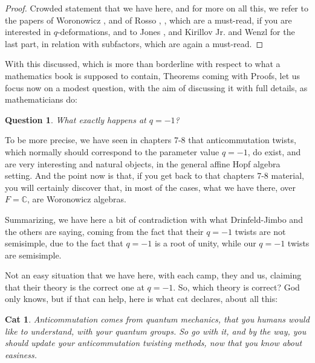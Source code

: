 \documentclass[12pt]{amsbook}
\newtheorem{cat}[theorem]{Cat}
\newtheorem{question}[theorem]{Question}
\begin{document}
\begin{proof}
Crowded statement that we have here, and for more on all this, we refer to the papers of Woronowicz \cite{wo1}, \cite{wo2} and of Rosso \cite{ro1}, \cite{ro2}, which are a must-read, if you are interested in $q$-deformations, and to Jones \cite{jo1}, \cite{jo3} and Kirillov Jr. \cite{kir} and Wenzl \cite{wen} for the last part, in relation with subfactors, which are again a must-read.
\end{proof}

With this discussed, which is more than borderline with respect to what a mathematics book is supposed to contain, Theorems coming with Proofs, let us focus now on a modest question, with the aim of discussing it with full details, as mathematicians do:

\begin{question}
What exactly happens at $q=-1$?
\end{question}

To be more precise, we have seen in chapters 7-8 that anticommutation twists, which normally should correspond to the parameter value $q=-1$, do exist, and are very interesting and natural objects, in the general affine Hopf algebra setting. And the point now is that, if you get back to that chapters 7-8 material, you will certainly discover that, in most of the cases, what we have there, over $F=\mathbb C$, are Woronowicz algebras.

\bigskip

Summarizing, we have here a bit of contradiction with what Drinfeld-Jimbo and the others are saying, coming from the fact that their $q=-1$ twists are not semisimple, due to the fact that $q=-1$ is a root of unity, while our $q=-1$ twists are semisimple.

\bigskip

Not an easy situation that we have here, with each camp, they and us, claiming that their theory is the correct one at $q=-1$. So, which theory is correct? God only knows, but if that can help, here is what cat declares, about all this:


\begin{cat}
Anticommutation comes from quantum mechanics, that you humans would like to understand, with your quantum groups. So go with it, and by the way, you should update your anticommutation twisting methods, now that you know about easiness. 
\end{cat}
\end{document}
